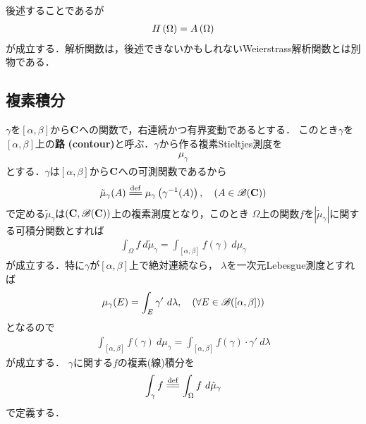 	後述することであるが
	\begin{align}
		H\left(\Omega\right) = A\left(\Omega\right)
	\end{align}
	が成立する．解析関数は，後述できないかもしれないWeierstrass解析関数とは別物である．
	
\subsection{複素積分}
	$\gamma$を$[\alpha,\beta]$から$\mathbf{C}$への関数で，右連続かつ有界変動であるとする．
	このとき$\gamma$を$[\alpha,\beta]$上の{\bf 路}
	{\bf (contour)}と呼ぶ．$\gamma$から作る複素Stieltjes測度を
	\begin{align}
		\mu_\gamma
	\end{align}
	とする．$\gamma$は$[\alpha,\beta]$から$\mathbf{C}$への可測関数であるから
	\begin{align}
		\tilde{\mu}_\gamma(A) \defeq \mu_\gamma\left( \gamma^{-1}(A) \right),
		\quad (A \in \borel{\C})
	\end{align}
	で定める$\tilde{\mu}_\gamma$は$(\mathbf{C},\mathscr{B}(\mathbf{C}))$上の複素測度となり，このとき
	$\Omega$上の関数$f$を$|\tilde{\mu}_\gamma|$に関する可積分関数とすれば
	\begin{align}
		\int_\Omega f\ d\tilde{\mu}_\gamma = \int_{[\alpha,\beta]} f(\gamma)\ d\mu_\gamma
	\end{align}
	が成立する．特に$\gamma$が$[\alpha,\beta]$上で絶対連続なら，
	$\lambda$を一次元Lebesgue測度とすれば
	\begin{align}
		\mu_\gamma(E) = \int_E \gamma'\ d\lambda,
		\quad (\forall E \in \mathscr{B}([\alpha,\beta]))
	\end{align}
	となるので
	\begin{align}
		\int_{[\alpha,\beta]} f(\gamma)\ d\mu_\gamma = \int_{[\alpha,\beta]} f(\gamma) \cdot \gamma'\ d\lambda
	\end{align}
	が成立する．
	$\gamma$に関する$f$の複素(線)積分を
	\begin{align}
		\int_\gamma f \defeq \int_\Omega f\ d\tilde{\mu}_\gamma
	\end{align}
	で定義する．
	
